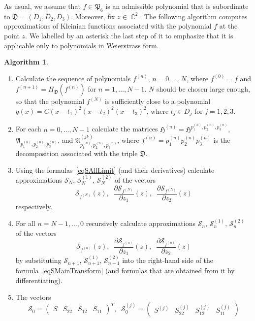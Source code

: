 \documentclass{amsart}
\numberwithin{equation}{section}
\theoremstyle{definition}
\newtheorem{algo}{Algorithm}[section]
\theoremstyle{remark}
\DeclareMathOperator{\CC}{\mathbb C}
\begin{document}
	As usual, we assume that $f \in \mathfrak P_6$ is an admissible polynomial that is subordinate to $\mathfrak D = (D_1,D_2,D_3)$. Moreover, fix $z \in \CC^2$. The following algorithm computes approximations of Kleinian functions associated with the polynomial $f$ at the point $z$. We labelled by an asterisk the last step of it to emphasize that it is applicable only to polynomials in Weierstrass form.
	\begin{algo}\label{algFunctions}
		\begin{enumerate}
			\item Calculate the sequence of polynomials $f^{(n)}$, $n = 0, \dots, N$, where $f^{(0)} = f$ and $f^{(n+1)} = H_{\mathfrak D}(f^{(n)})$ for $n = 1, \dots, N-1$. $N$ should be chosen large enough, so that the polynomial $f^{(N)}$ is sufficiently close to a polynomial $g(x) = C(x - t_1)^2(x - t_2)^2(x - t_3)^2$, where $t_j \in D_j$ for $j = 1,2,3$.
			\item For each $n = 0,\dots,N-1$ calculate the matrices $\mathfrak H^{(n)} = \mathfrak H^{p_1^{(n)}, p_2^{(n)}, p_3^{(n)}}$, $\mathfrak A_{p_1^{(n)}, p_2^{(n)}, p_3^{(n)}}$, and $\mathfrak A_{p_1^{(n)}, p_2^{(n)}, p_3^{(n)}}^{(jk)}$, where $f^{(n)} = p_1^{(n)}p_2^{(n)}p_3^{(n)}$ is the decomposition associated with the triple $\mathfrak D$.
			\item Using the formulas~\eqref{eqSAllLimit} (and their derivatives) calculate approximations $\mathscr S_{N}$, $\mathscr S_{N}^{(1)}$, $\mathscr S_{N}^{(2)}$ of the vectors
			\[
			\mathscr S_{f^{(N)}}(z), \;\;\frac{\partial \mathscr S_{f^{(N)}}}{\partial z_1}(z), \;\; \frac{\partial \mathscr S_{f^{(N)}}}{\partial z_2}(z)
			\]
			respectively.
			\item For all $n = N - 1, \dots, 0$ recursively calculate approximations $\mathscr S_{n}$, $\mathscr S_{n}^{(1)}$, $\mathscr S_{n}^{(2)}$ of the vectors
			\[
			\mathscr S_{f^{(n)}}(z), \;\;\frac{\partial \mathscr S_{f^{(n)}}}{\partial z_1}(z), \;\; \frac{\partial \mathscr S_{f^{(n)}}}{\partial z_2}(z)
			\]
			by substituting $\mathscr S_{n+1}$, $\mathscr S_{n+1}^{(1)}$, $\mathscr S_{n+1}^{(2)}$ into the right-hand side of the formula~\eqref{eqSMainTransform} (and formulas that are obtained from it by differentiating).
			\item The vectors
			\[
			\mathscr S_{0} = \begin{pmatrix}
				S & S_{22} & S_{12} & S_{11}
			\end{pmatrix}^T,\;\;\mathscr S_{0}^{(j)} = \begin{pmatrix}
				S^{(j)} & S_{22}^{(j)} & S_{12}^{(j)} & S_{11}^{(j)}

\end{pmatrix}\]
\end{enumerate}
\end{algo}
\end{document}
